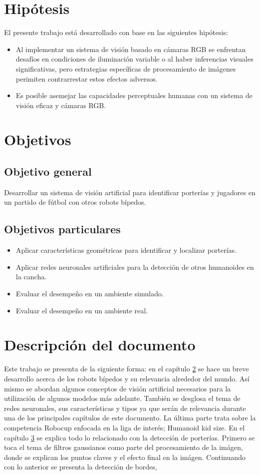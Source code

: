 \section{Hipótesis}
El presente trabajo está desarrollado con base en las siguientes hipótesis:
\begin{itemize}
	\item Al implementar un sistema de visión basado en cámaras RGB se enfrentan desafíos en condiciones de iluminación variable o al haber inferencias visuales significativas, pero estrategias específicas de procesamiento de imágenes perimiten contrarrestar estos efectos adversos.
	\item Es posible asemejar las capacidades perceptuales humanas con un sistema de visión eficaz y cámaras RGB.
\end{itemize}

\section{Objetivos}

\subsection*{Objetivo general}
Desarrollar un sistema de visión artificial para identificar porterías y jugadores en un partido de fútbol con otros robots bípedos.
\subsection*{Objetivos particulares}
\begin{itemize}
    \item Aplicar características geométricas para identificar y localizar porterías.
    \item Aplicar redes neuronales artificiales para la detección de otros humanoides en la cancha.
    \item Evaluar el desempeño en un ambiente simulado.
    \item Evaluar el desempeño en un ambiente real.
\end{itemize}
\section{Descripción del documento}
Este trabajo se presenta de la siguiente forma: en el capítulo \hyperref[sec:marcoteorico]{2} se hace un breve desarrollo acerca de los robots bípedos y su relevancia alrededor del mundo. Así mismo se abordan algunos conceptos de visión artificial necesarios para la utilización de algunos modelos más adelante. También se desglosa el tema de redes neuronales, sus características y tipos ya que serán de relevancia durante una de los principales capítulos de este documento. La última parte trata sobre la competencia Robocup enfocada en la liga de interés; Humanoid kid size. En el capítulo \hyperref[sec:porteria]{3} se explica todo lo relacionado con la detección de porterías. Primero se toca el tema de filtros gaussianos como parte del procesamiento de la imágen, donde se explican los puntos claves y el efecto final en la imágen. Continuando con lo anterior se presenta la detección de bordes,   
